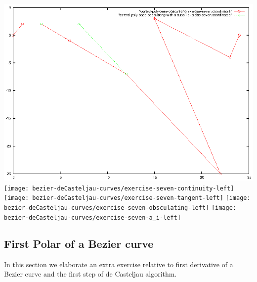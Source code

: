 \documentclass{article}
\begin{document}
\includegraphics{bezier-deCasteljau-curves/exercise-seven-a_succ_i}
\texttt{[image: bezier-deCasteljau-curves/exercise-seven-continuity-left]}
\texttt{[image: bezier-deCasteljau-curves/exercise-seven-tangent-left]}
\texttt{[image: bezier-deCasteljau-curves/exercise-seven-obsculating-left]}
\texttt{[image: bezier-deCasteljau-curves/exercise-seven-a\_i-left]}

\subsection{First Polar of a Bezier curve}

In this section we elaborate an extra exercise relative to first derivative
of a Bezier curve and the first step of de Casteljau algorithm. 
\end{document}
